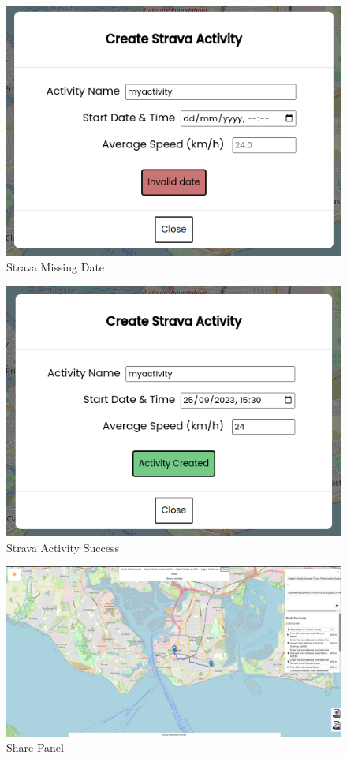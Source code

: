 \begin{figure}[!ht]
    \centering
    \includegraphics[width=425px]{figures/Progress Images/Iteration-2/SR18/SR18 Create Activity Fail - Missing DateTime.png}
    \caption{Strava Missing Date}
    \label{fig:missing-date-strava}
\end{figure}

\begin{figure}[!ht]
    \centering
    \includegraphics[width=425px]{figures/Progress Images/Iteration-2/SR18/SR18 Create Activity Success.png}
    \caption{Strava Activity Success}
    \label{fig:success-strava}
\end{figure}

\begin{figure}[!ht]
    \centering
    \includegraphics[width=425px]{figures/Progress Images/Iteration-2/SR18/SR18 Share Panel.png}
    \caption{Share Panel}
    \label{fig:share}
\end{figure}

